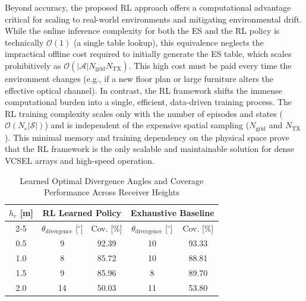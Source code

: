 \documentclass[twocolumn,twoside]{IEEEtran}
\theoremstyle{break}
\begin{document}
Beyond accuracy, the proposed RL approach offers a  computational advantage critical for scaling to real-world environments and mitigating {environmental drift}. While the online inference complexity for both the ES and the RL policy is technically $\mathcal{O}(1)$ (a single table lookup), this equivalence neglects the impractical {offline cost} required to initially generate the ES table, which scales prohibitively as $\mathcal{O}(|\mathcal{A}| N_{\text{grid}} N_{\text{TX}})$. This high cost must be paid every time the environment changes (e.g., if a new floor plan or large furniture alters the effective optical channel). In contrast, the RL framework shifts the immense computational burden into a single, efficient, data-driven training process. The RL training complexity scales only with the number of episodes and states ($\mathcal{O}(N_e  |\mathcal{S}|)$) and is {independent of the expensive spatial sampling} ($N_{\text{grid}}$ and $N_{\text{TX}}$). This minimal memory and training dependency on the physical space prove that the RL framework is the only scalable and maintainable solution for dense VCSEL arrays and high-speed operation.


%
\begin{table}[t]
	\centering
	\small
	\caption{Learned Optimal Divergence Angles and Coverage Performance Across Receiver Heights}
	\label{tab:rl_policy}
	\renewcommand{\arraystretch}{1.1}
	\begin{tabular}{c|cc|cc}
		\hline
		\textbf{$h_r$ [m]} & \multicolumn{2}{c|}{\textbf{RL Learned Policy}} & \multicolumn{2}{c}{\textbf{Exhaustive Baseline}} \\
		\cline{2-5}
		& $\theta_{\text{divergence}}$ [$^\circ$] & Cov. [\%] & $\theta_{\text{divergence}}$ [$^\circ$] & Cov. [\%] \\
		\hline
		0.5 & 9  & 92.39 & 10 & 93.33 \\
		1.0 & 8  & 85.72 & 10 & 88.81 \\
		1.5 & 9  & 85.96 & 8  & 89.70 \\
		2.0 & 14 & 50.03 & 11 & 53.80 \\
		\hline
	\end{tabular}
\end{table}
%
\end{document}
